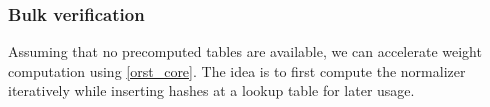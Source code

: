 \documentclass[psamsfonts, reqno]{amsart}
\theoremstyle{definition}
\theoremstyle{remark}
\numberwithin{equation}{section}
\begin{document}

\subsubsection{Bulk verification}\label{section_incremental _verification}
Assuming that no precomputed tables are available,
we can accelerate weight computation using \eqref{orst_core}.
The idea is to first compute the normalizer iteratively while
inserting hashes at a lookup table for later usage.
\end{document}
